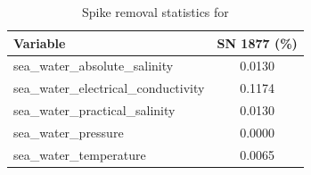 \begin{table}[h]
\centering
\caption{Spike removal statistics for \projectname{} \casenumber{}}
\label{tab:spike_stats}
\begin{tabular}{|l|c|}
\hline
Variable & SN 1877 (\%) \\
\hline
sea\_water\_absolute\_salinity & 0.0130 \\
sea\_water\_electrical\_conductivity & 0.1174 \\
sea\_water\_practical\_salinity & 0.0130 \\
sea\_water\_pressure & 0.0000 \\
sea\_water\_temperature & 0.0065 \\
\hline
\end{tabular}
\end{table}
